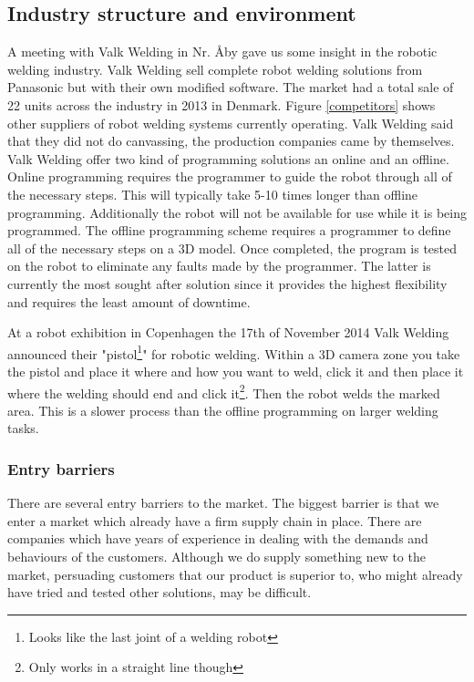 \subsection{Industry structure and environment}
\label{ind.struc}
A meeting with Valk Welding in Nr. Åby\cite{valk_welding_summary} gave us some insight in the robotic welding industry. Valk Welding sell complete robot welding solutions from Panasonic but with their own modified software. The market had a total sale of 22 units across the industry in 2013 in Denmark. Figure \ref{competitors} shows other suppliers of robot welding systems currently operating. Valk Welding said that they did not do canvassing, the production companies came by themselves. Valk Welding offer two kind of programming solutions an online and an offline. 
Online programming requires the programmer to guide the robot through all of the necessary steps. This will typically take 5-10 times longer than offline programming. Additionally the robot will not be available for use while it is being programmed. The offline programming scheme requires a programmer to define all of the necessary steps on a 3D model. Once completed, the program is tested on the robot to eliminate any faults made by the programmer. The latter is currently the most sought after solution since it provides the highest flexibility and requires the least amount of downtime.

At a robot exhibition in Copenhagen the 17th of November 2014 Valk Welding announced their "pistol\footnote{Looks like the last joint of a welding robot}" for robotic welding. Within a 3D camera zone you take the pistol and place it where and how you want to weld, click it and then place it where the welding should end and click it\footnote{Only works in a straight line though}. Then the robot welds the marked area. This is a slower process than the offline programming on larger welding tasks.
\subsubsection{Entry barriers}
There are several entry barriers to the market. The biggest barrier is that we enter a market which already have a firm supply chain in place. There are companies which have years of experience in dealing with the demands and behaviours of the customers. Although we do supply something new to the market, persuading customers that our product is superior to, who might already have tried and tested other solutions, may be difficult.

